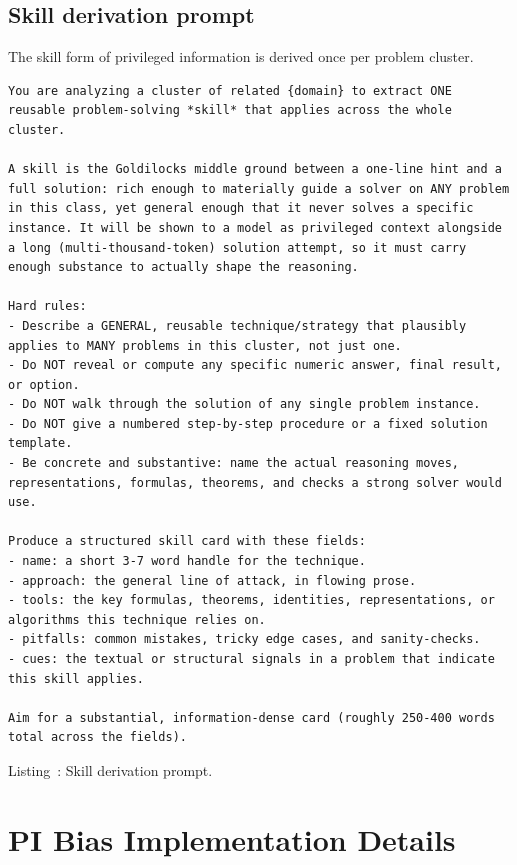 \documentclass{article}
\newcounter{promptlisting}
\newcommand{\listingcaption}[1]{%
  \vspace{-2pt}%
  {\centering\small Listing~\refstepcounter{promptlisting}\thepromptlisting: #1\par}%
  \vspace{6pt}}
\newenvironment{plst}{\par\addvspace{\medskipamount}\noindent\begin{minipage}{\columnwidth}}%
  {\end{minipage}\par\addvspace{\medskipamount}}
\begin{document}
\subsection{Skill derivation prompt}
\label{app:sub:skill}

The skill form of privileged information is derived once per problem cluster.

\begin{plst}
\begin{Verbatim}
You are analyzing a cluster of related {domain} to extract ONE reusable problem-solving *skill* that applies across the whole cluster.

A skill is the Goldilocks middle ground between a one-line hint and a full solution: rich enough to materially guide a solver on ANY problem in this class, yet general enough that it never solves a specific instance. It will be shown to a model as privileged context alongside a long (multi-thousand-token) solution attempt, so it must carry enough substance to actually shape the reasoning.

Hard rules:
- Describe a GENERAL, reusable technique/strategy that plausibly applies to MANY problems in this cluster, not just one.
- Do NOT reveal or compute any specific numeric answer, final result, or option.
- Do NOT walk through the solution of any single problem instance.
- Do NOT give a numbered step-by-step procedure or a fixed solution template.
- Be concrete and substantive: name the actual reasoning moves, representations, formulas, theorems, and checks a strong solver would use.

Produce a structured skill card with these fields:
- name: a short 3-7 word handle for the technique.
- approach: the general line of attack, in flowing prose.
- tools: the key formulas, theorems, identities, representations, or algorithms this technique relies on.
- pitfalls: common mistakes, tricky edge cases, and sanity-checks.
- cues: the textual or structural signals in a problem that indicate this skill applies.

Aim for a substantial, information-dense card (roughly 250-400 words total across the fields).
\end{Verbatim}
\listingcaption{Skill derivation prompt.}
\end{plst}

\section{PI Bias Implementation Details}
\label{app:pibias}
\end{document}
